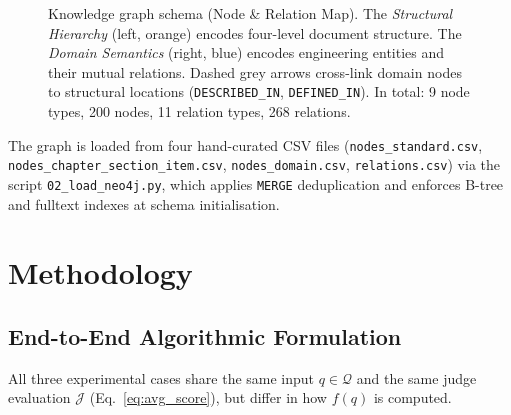 \documentclass[twocolumn]{article}
\begin{document}
\begin{figure}[t]
  \caption{Knowledge graph schema (Node \& Relation Map).
    The \emph{Structural Hierarchy} (left, orange) encodes four-level document
    structure. The \emph{Domain Semantics} (right, blue) encodes engineering entities
    and their mutual relations. Dashed grey arrows cross-link domain nodes to
    structural locations (\texttt{DESCRIBED\_IN}, \texttt{DEFINED\_IN}).
    In total: 9 node types, 200 nodes, 11 relation types, 268 relations.}
  \label{fig:schema}
\end{figure}

The graph is loaded from four hand-curated CSV files
(\texttt{nodes\_standard.csv}, \texttt{nodes\_chapter\_section\_item.csv},
\texttt{nodes\_domain.csv}, \texttt{relations.csv}) via the script
\texttt{02\_load\_neo4j.py}, which applies \texttt{MERGE} deduplication and
enforces B-tree and fulltext indexes at schema initialisation.

\section{Methodology}
\label{sec:method}

\subsection{End-to-End Algorithmic Formulation}
\label{sec:formulation}

All three experimental cases share the same input $q\in\mathcal{Q}$ and the same
judge evaluation $\mathcal{J}$ (Eq.~\ref{eq:avg_score}), but differ in how $f(q)$ is computed.
\end{document}
